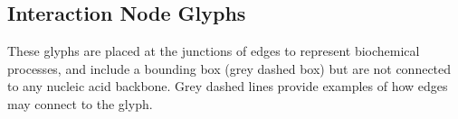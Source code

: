 

\subsection{Interaction Node Glyphs}\label{apdx:sym:interactionnodes}

These glyphs are placed at the junctions of edges to represent biochemical processes, and include a bounding box (grey dashed box) but are not connected to any nucleic acid backbone. Grey dashed lines provide examples of how edges may connect to the glyph.


